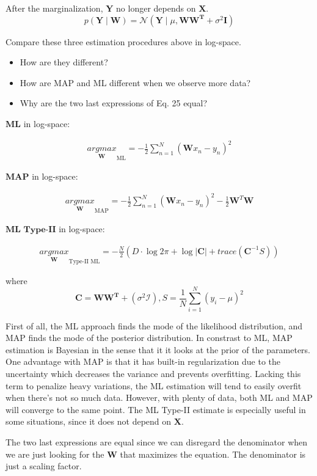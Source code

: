 \documentclass[12pt]{article}
\newenvironment{question}[2][Question]{\begin{trivlist}
\kern10pt
\item[\hskip \labelsep {\bfseries #1}\hskip \labelsep {\bfseries #2.}]}{\end{trivlist}}
\newcommand*{\answer}{%
  \par
  \kern1pt
  \begingroup
    \centering
    \raisebox{.2\baselineskip}{%
      \textcolor{gray}{
	    \rule{.6667\linewidth}{.1pt}%
      }
    }%
    \par
  \kern8pt
  \endgroup
}
\begin{document}
\begin{question}{17}
After the marginalization, $\boldsymbol{Y}$ no longer depends on $\boldsymbol{X}$.
\begin{equation}
p(\boldsymbol{Y} \mid \boldsymbol{W}) = \mathcal{N}(\boldsymbol{Y} \mid \mu, \boldsymbol{WW^T} + \sigma^2\boldsymbol{I})
\end{equation}

\end{question}

\begin{question}{19}
Compare these three estimation procedures above in log-space.
\begin{itemize}
\item How are they different?
\item How are MAP and ML different when we observe more data?
\item Why are the two last expressions of Eq. 25 equal?
\end{itemize}
\answer

$\textbf{ML}$ in log-space:

\begin{align}
\underset{\boldsymbol{W}}{argmax}_{\text{ML}} = - \frac{1}{2} \sum_{n=1}^N (\boldsymbol{W}x_n - y_n)^2
\end{align}

$\textbf{MAP}$ in log-space:

\begin{align}
\underset{\boldsymbol{W}}{argmax}_{\text{MAP}} = - \frac{1}{2} \sum_{n=1}^N (\boldsymbol{W}x_n - y_n)^2 - \frac{1}{2} \boldsymbol{W}^T \boldsymbol{W}
\end{align}

$\textbf{ML Type-II}$ in log-space:

\begin{align}
\underset{\boldsymbol{W}}{argmax}_{\text{Type-II ML}} = - \frac{N}{2} (D \cdot \log 2\pi + \log |\boldsymbol{C}| + trace(\boldsymbol{C}^{-1}S))
\end{align}

where $$\boldsymbol{C} = \boldsymbol{WW^T} + (\sigma^2 \mathcal{I}), S = \frac{1}{N} \sum_{i=1}^{N}(y_i - \mu)^2
$$

First of all, the ML approach finds the mode of the likelihood distribution, and MAP finds the mode of the posterior distribution.
In constrast to ML, MAP estimation is Bayesian in the sense that it it looks at the prior of the parameters. One advantage with MAP is that it has built-in regularization due to the uncertainty which decreases the variance and prevents overfitting. Lacking this term to penalize heavy variations, the ML estimation will tend to easily overfit when there's not so much data. However, with plenty of data, both ML and MAP will converge to the same point. The ML Type-II estimate is especially useful in some situations, since it does not depend on $\boldsymbol{X}$.

The two last expressions are equal since we can disregard the denominator when we are just looking for the $\boldsymbol{W}$ that maximizes the equation. The denominator is just a scaling factor.

\end{question}
\end{document}

